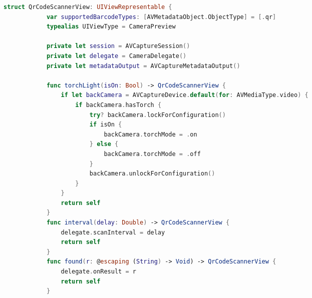 \begin{spacing}{2}
\end{spacing}
\begin{minipage}{\textwidth}
    \linespread{0.8}\selectfont
    \begin{lstlisting}[language=swift]
        struct QrCodeScannerView: UIViewRepresentable {
            var supportedBarcodeTypes: [AVMetadataObject.ObjectType] = [.qr]
            typealias UIViewType = CameraPreview
            
            private let session = AVCaptureSession()
            private let delegate = CameraDelegate()
            private let metadataOutput = AVCaptureMetadataOutput()
            
            func torchLight(isOn: Bool) -> QrCodeScannerView {
                if let backCamera = AVCaptureDevice.default(for: AVMediaType.video) {
                    if backCamera.hasTorch {
                        try? backCamera.lockForConfiguration()
                        if isOn {
                            backCamera.torchMode = .on
                        } else {
                            backCamera.torchMode = .off
                        }
                        backCamera.unlockForConfiguration()
                    }
                }
                return self
            }
            func interval(delay: Double) -> QrCodeScannerView {
                delegate.scanInterval = delay
                return self
            }
            func found(r: @escaping (String) -> Void) -> QrCodeScannerView {
                delegate.onResult = r
                return self
            }
    \end{lstlisting}   
\end{minipage}

